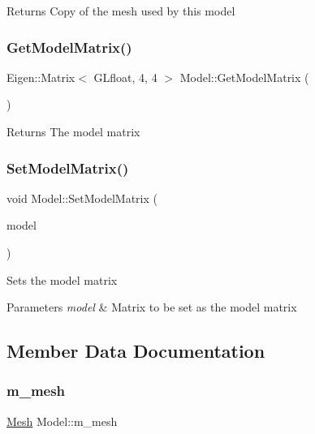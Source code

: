 \begin{DoxyReturn}{Returns}
Copy of the mesh used by this model 
\end{DoxyReturn}
\mbox{\label{classModel_af37e550b25274838de666ddc7e2167d6}} 
\subsubsection{\texorpdfstring{Get\+Model\+Matrix()}{GetModelMatrix()}}
{\footnotesize\ttfamily Eigen\+::\+Matrix$<$ G\+Lfloat, 4, 4 $>$ Model\+::\+Get\+Model\+Matrix (\begin{DoxyParamCaption}{ }\end{DoxyParamCaption})}

\begin{DoxyReturn}{Returns}
The model matrix 
\end{DoxyReturn}
\mbox{\label{classModel_a6b79c9e0c9abc50896e70fe1fabff4e7}} 
\subsubsection{\texorpdfstring{Set\+Model\+Matrix()}{SetModelMatrix()}}
{\footnotesize\ttfamily void Model\+::\+Set\+Model\+Matrix (\begin{DoxyParamCaption}\item[{Eigen\+::\+Matrix$<$ G\+Lfloat, 4, 4 $>$}]{model }\end{DoxyParamCaption})}

Sets the model matrix 
\begin{DoxyParams}{Parameters}
{\em model} & Matrix to be set as the model matrix \\
\hline
\end{DoxyParams}


\subsection{Member Data Documentation}
\mbox{\label{classModel_afe425f579d17b798e6c454a5c5e2d952}} 
\subsubsection{\texorpdfstring{m\+\_\+mesh}{m\_mesh}}
{\footnotesize\ttfamily \hyperlink{classMesh}{Mesh} Model\+::m\+\_\+mesh\hspace{0.3cm}{\ttfamily [protected]}}

